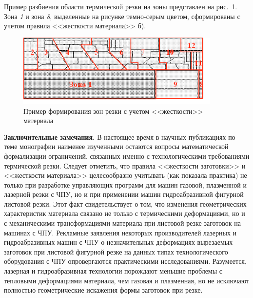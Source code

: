 \documentclass[11pt,twoside,openany]{report}
\begin{document}
Пример разбиения области термической резки на зоны
представлен на
рис.~\ref{zones}.
Зона {\it 1} и зона {\it 8},
выделенные на рисунке темно-серым цветом,
сформированы с учетом правила <<жесткости материала>> б).

\begin{figure}[h]
  \begin{center}
  \includegraphics[width=0.9\textwidth]{zones.png}
  \caption{Пример формирования зон резки с учетом <<жесткости>> материала}
  \label{zones}
  \end{center}
\end{figure}

{\bf Заключительные замечания.}
В настоящее время в научных публикациях по теме монографии
наименее изученными остаются вопросы математической формализации ограничений,
связанных именно с технологическими требованиями термической резки.
Следует отметить, что правила <<жесткости заготовки>> и <<жесткости материала>>
целесообразно учитывать (как показала практика)
не только при разработке управляющих программ для машин газовой,
плазменной и лазерной резки с ЧПУ,
но и при применении машин гидроабразивной фигурной листовой резки.
Этот факт свидетельствует о том,
что изменения геометрических характеристик материала
связано не только с термическими деформациями,
но и с механическими трансформациями материала
при листовой резке заготовок на машинах с ЧПУ.
Рекламные заявления некоторых производителей
лазерных и гидроабразивных машин с ЧПУ о незначительных
деформациях вырезаемых заготовок при листовой фигурной
резке на данных типах технологического оборудования с ЧПУ
опровергаются практическими исследованиями.
Разумеется, лазерная и гидроабразивная технологии
порождают меньшие проблемы с тепловыми деформациями материала,
чем газовая и плазменная,
но не исключают полностью геометрические искажения формы заготовок при резке.
\end{document}
